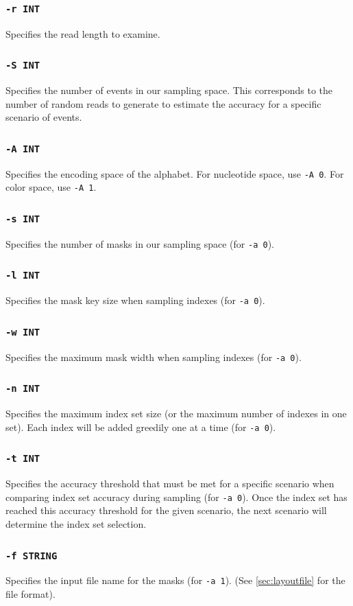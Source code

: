 \documentclass[a4paper,12pt]{book}
\newcommand{\TT}[1]{{\tt #1}} %
\begin{document}
\subsubsection{\TT{-r INT}}
Specifies the read length to examine.
\subsubsection{\TT{-S INT}}
Specifies the number of events in our sampling space.
This corresponds to the number of random reads to generate to estimate the accuracy for a specific scenario of events.
\subsubsection{\TT{-A INT}}
Specifies the encoding space of the alphabet.
For nucleotide space, use \TT{-A 0}.
For color space, use \TT{-A 1}.
\subsubsection{\TT{-s INT}}
Specifies the number of masks in our sampling space (for \TT{-a 0}).
\subsubsection{\TT{-l INT}}
Specifies the mask key size when sampling indexes (for \TT{-a 0}).
\subsubsection{\TT{-w INT}}
Specifies the maximum mask width when sampling indexes (for \TT{-a 0}).
\subsubsection{\TT{-n INT}}
Specifies the maximum index set size (or the maximum number of indexes in one set).
Each index will be added greedily one at a time (for \TT{-a 0}).
\subsubsection{\TT{-t INT}}
Specifies the accuracy threshold that must be met for a specific scenario when comparing index set accuracy during sampling (for \TT{-a 0}).
Once the index set has reached this accuracy threshold for the given scenario, the next scenario will determine the index set selection.
\subsubsection{\TT{-f STRING}}
Specifies the input file name for the masks (for \TT{-a 1}).
(See \autoref{sec:layoutfile} for the file format).
\end{document}
